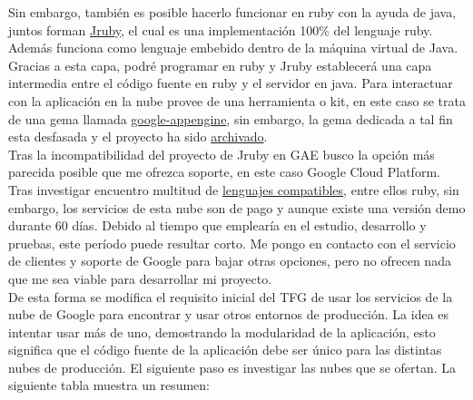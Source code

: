 Sin embargo, también es posible hacerlo funcionar en ruby con la ayuda de java, juntos forman \href{http://jruby.org/}{Jruby}, el cual es una implementación 100\% del lenguaje ruby. Además funciona como lenguaje embebido dentro de la máquina virtual de Java. Gracias a esta capa, podré programar en ruby y Jruby establecerá una capa intermedia entre el código fuente en ruby y el servidor en java. Para interactuar con la aplicación en la nube provee de una herramienta o kit, en este caso se trata de una gema llamada \href{https://rubygems.org/gems/google-appengine}{google-appengine}, sin embargo, la gema
dedicada a tal fin esta desfasada y el proyecto ha sido \href{https://code.google.com/p/appengine-jruby/}{archivado}.\\

Tras la incompatibilidad del proyecto de Jruby en GAE busco la opción más parecida posible que me ofrezca soporte, en este caso Google Cloud Platform. Tras investigar encuentro multitud de \href{https://cloud.google.com/launcher/explore}{lenguajes compatibles}, entre ellos ruby, sin embargo, los servicios de esta nube son de pago y aunque existe una versión demo durante 60 días. Debido al tiempo que emplearía en el estudio, desarrollo y pruebas, este período puede resultar corto. Me pongo en contacto con el servicio de clientes y soporte de Google para bajar otras opciones, pero no ofrecen nada que me sea viable para desarrollar mi proyecto.\\

De esta forma se modifica el requisito inicial del TFG de usar los servicios de la nube de Google para encontrar y usar otros entornos de producción. La idea es intentar usar más de uno, demostrando la modularidad de la aplicación, esto significa que el código fuente de la aplicación debe ser único para las distintas nubes de producción. El siguiente paso es investigar las nubes que se ofertan. La siguiente tabla muestra un resumen:

